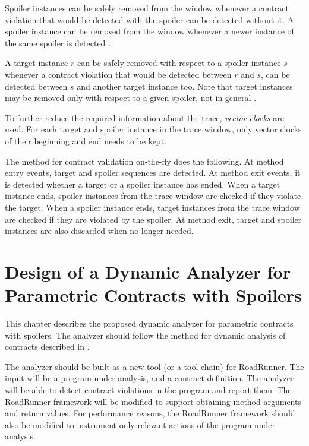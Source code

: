 Spoiler instances can be safely removed from the window whenever a contract
violation that would be detected with the spoiler can be detected without it. A
spoiler instance can be removed from the window whenever a newer instance of the
same spoiler is detected \cite{contracts}.

A target instance $r$ can be safely removed with respect to a spoiler instance
$s$ whenever a contract violation that would be detected between $r$ and $s$,
can be detected between $s$ and another target instance too. Note that target
instances may be removed only with respect to a given spoiler, not in general
\cite{contracts}.

To further reduce the required information about the trace, \emph{vector clocks}
are used. For each target and spoiler instance in the trace window, only vector
clocks of their beginning and end needs to be kept.

The method for contract validation on-the-fly does the following. At method
entry events, target and spoiler sequences are detected. At method exit events,
it is detected whether a target or a spoiler instance has ended. When a target
instance ends, spoiler instances from the trace window are checked if they
violate the target. When a spoiler instance ends, target instances from the
trace window are checked if they are violated by the spoiler. At method exit,
target and spoiler instances are also discarded when no longer needed.



\chapter{Design of a Dynamic Analyzer for Parametric Contracts with Spoilers}
\label{chFour}

This chapter describes the proposed dynamic analyzer for parametric contracts
with spoilers. The analyzer should follow the method for dynamic analysis of
contracts described in \cite{contracts}. 

The analyzer should be built as a new tool (or a tool chain) for RoadRunner. The
input will be a program under analysis, and a contract definition. The analyzer
will be able to detect contract violations in the program and report them. The
RoadRunner framework will be modified to support obtaining method arguments and
return values. For performance reasons, the RoadRunner framework should also be
modified to instrument only relevant actions of the program under analysis.


